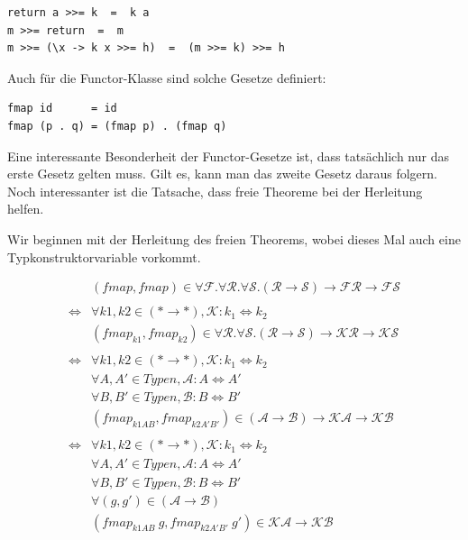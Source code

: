 \begin{verbatim}
return a >>= k  =  k a
m >>= return  =  m
m >>= (\x -> k x >>= h)  =  (m >>= k) >>= h
\end{verbatim}

Auch für die Functor-Klasse sind solche Gesetze definiert:

\begin{verbatim}
fmap id      = id
fmap (p . q) = (fmap p) . (fmap q)
\end{verbatim}

Eine interessante Besonderheit der Functor-Gesetze ist, dass tatsächlich nur das erste Gesetz gelten muss. Gilt es, kann
man das zweite Gesetz daraus folgern. Noch interessanter ist die Tatsache, dass freie Theoreme bei der Herleitung helfen.

Wir beginnen mit der Herleitung des freien Theorems, wobei dieses Mal auch eine Typkonstruktorvariable vorkommt.


\begin{align*}
&(fmap, fmap) \in \forall \mathcal{F} . \forall \mathcal{R} . \forall \mathcal{S} . (\mathcal{R} \rightarrow \mathcal{S})
\rightarrow \mathcal{F} \mathcal{R} \rightarrow \mathcal{F} \mathcal{S} \\
&\\
\Leftrightarrow &
\forall k1, k2 \in (* \rightarrow *), \mathcal{K} : k_1 \Leftrightarrow k_2 \\
&(fmap_{k1}, fmap_{k2}) \in \forall \mathcal{R} . \forall \mathcal{S} . (\mathcal{R} \rightarrow \mathcal{S}) \rightarrow
\mathcal{K} \mathcal{R} \rightarrow \mathcal{K} \mathcal{S} \\
&\\
\Leftrightarrow &
\forall k1, k2 \in (* \rightarrow *), \mathcal{K} : k_1 \Leftrightarrow k_2 \\
&\forall A, A' \in Typen, \mathcal{A} : A \Leftrightarrow A' \\
&\forall B, B' \in Typen, \mathcal{B} : B \Leftrightarrow B' \\
&(fmap_{k1 A B}, fmap_{k2 A' B'}) \in (\mathcal{A} \rightarrow \mathcal{B}) \rightarrow
\mathcal{K} \mathcal{A} \rightarrow \mathcal{K} \mathcal{B} \\
&\\
\Leftrightarrow &
\forall k1, k2 \in (* \rightarrow *), \mathcal{K} : k_1 \Leftrightarrow k_2 \\
&\forall A, A' \in Typen, \mathcal{A} : A \Leftrightarrow A' \\
&\forall B, B' \in Typen, \mathcal{B} : B \Leftrightarrow B' \\
&\forall (g, g') \in (\mathcal{A} \rightarrow \mathcal{B}) \\
&(fmap_{k1 A B}\ g, fmap_{k2 A' B'}\ g') \in \mathcal{K} \mathcal{A} \rightarrow \mathcal{K} \mathcal{B} \\
\end{align*}

